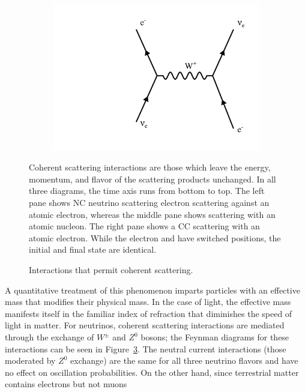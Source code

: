 \begin{figure}[t]
\begin{subfigure}[b]{0.3\textwidth}
                \caption{}
                 \label{ncHad}
        \end{subfigure}
        ~
        \begin{subfigure}[b]{0.3\textwidth}
                \centering
                \includegraphics[width=\textwidth]{figures/feynman/ccElec.pdf}
                \caption{}
                 \label{ccElec}
        \end{subfigure}
\caption{Interactions that permit coherent scattering.}{
Coherent scattering interactions are those which leave the energy, momentum,
and flavor of the scattering products unchanged.
In all three diagrams, the time axis runs from bottom to top.
The left pane shows NC neutrino scattering electron scattering against an
atomic electron, whereas the middle pane shows scattering with an atomic
nucleon.
The right pane shows a CC scattering with an atomic electron.
While the electron and \nue have switched positions, the initial and
final state are identical.
}
\label{cohScatter}
\end{figure}
A quantitative treatment of this phenomenon imparts particles with an effective
mass that modifies their physical mass.
In the case of light, the effective mass manifests itself in the familiar index
of refraction that diminishes the speed of light in matter.
For neutrinos, coherent scattering interactions are mediated through the
exchange of $W^\pm$ and $Z^0$ bosons; the Feynman diagrams for these
interactions can be seen in Figure~\ref{cohScatter}.
The neutral current interactions (those moderated by $Z^0$ exchange) are the
same for all three neutrino flavors and have no effect on oscillation
probabilities.
On the other hand, since terrestrial matter contains electrons but not muons
